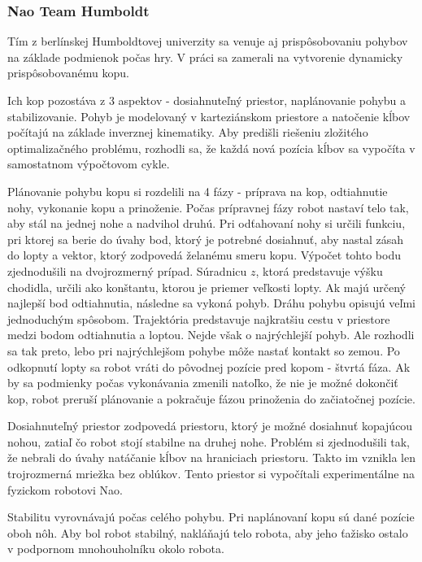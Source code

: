 \subsubsection{Nao Team Humboldt} \label{humboldt}
Tím z berlínskej Humboldtovej univerzity sa venuje aj prispôsobovaniu pohybov na základe podmienok počas hry. V práci \cite{humboldt} sa zamerali na vytvorenie dynamicky prispôsobovanému kopu.

Ich kop pozostáva z 3 aspektov - dosiahnuteľný priestor, naplánovanie pohybu a stabilizovanie. Pohyb je modelovaný v karteziánskom priestore a natočenie kĺbov počítajú na základe inverznej kinematiky. Aby predišli riešeniu zložitého optimalizačného problému, rozhodli sa, že každá nová pozícia kĺbov sa vypočíta v samostatnom výpočtovom cykle.

Plánovanie pohybu kopu si rozdelili na 4 fázy - príprava na kop, odtiahnutie nohy, vykonanie kopu a prinoženie. Počas prípravnej fázy robot nastaví telo tak, aby stál na jednej nohe a nadvihol druhú. Pri odťahovaní nohy si určili funkciu, pri ktorej sa berie do úvahy bod, ktorý je potrebné dosiahnuť, aby nastal zásah do lopty a vektor, ktorý zodpovedá želanému smeru kopu. Výpočet tohto bodu zjednodušili na dvojrozmerný prípad. Súradnicu $z$, ktorá predstavuje výšku chodidla, určili ako konštantu, ktorou je priemer veľkosti lopty. Ak majú určený najlepší bod odtiahnutia, následne sa vykoná pohyb. Dráhu pohybu opisujú veľmi jednoduchým spôsobom. Trajektória predstavuje najkratšiu cestu v priestore medzi bodom odtiahnutia a loptou. Nejde však o najrýchlejší pohyb. Ale rozhodli sa tak preto, lebo pri najrýchlejšom pohybe môže nastať kontakt so zemou. Po odkopnutí lopty sa robot vráti do pôvodnej pozície pred kopom - štvrtá fáza. Ak by sa podmienky počas vykonávania zmenili natoľko, že nie je možné dokončiť kop, robot preruší plánovanie a pokračuje fázou prinoženia do začiatočnej pozície.

Dosiahnuteľný priestor zodpovedá priestoru, ktorý je možné dosiahnuť kopajúcou nohou, zatiaľ čo robot stojí stabilne na druhej nohe. Problém si zjednodušili tak, že nebrali do úvahy natáčanie kĺbov na hraniciach priestoru. Takto im vznikla len trojrozmerná mriežka bez oblúkov. Tento priestor si vypočítali experimentálne na fyzickom robotovi Nao.

Stabilitu vyrovnávajú počas celého pohybu. Pri naplánovaní kopu sú dané pozície oboh nôh. Aby bol robot stabilný, nakláňajú telo robota, aby jeho ťažisko ostalo v podpornom mnohouholníku okolo robota.